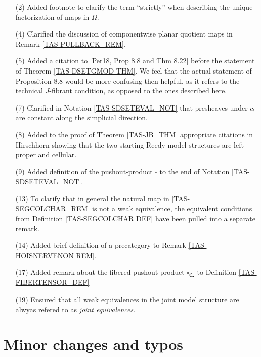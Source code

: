 \documentclass[a4paper,10pt
]{article}%
\numberwithin{equation}{section}
\numberwithin{figure}{section}
\theoremstyle{definition} %
\newcommand{\1}{\ensuremath{\mathbbm 1}}%
\begin{document}
\begin{enumerate}
\item[(2)] Added footnote to clarify the term ``strictly'' when describing the unique factorization of maps in $\Omega$.
\item[(4)] Clarified the discussion of componentwise planar quotient maps in Remark \ref{TAS-PULLBACK_REM}.
\item[(5)] Added a citation to [Per18, Prop 8.8 and Thm 8.22] before the statement of Theorem \ref{TAS-DSETGMOD THM}.
        We feel that the actual statement of Proposition 8.8 would be more confusing then helpful, as it refers to the technical $J$-fibrant condition, as opposed to the ones described here.
\item[(7)] Clarified in Notation \ref{TAS-SDSETEVAL_NOT} that presheaves under $c_!$ are constant along the simplicial direction.
\item[(8)] Added to the proof of Theorem \ref{TAS-JB_THM} appropriate citations in Hirschhorn showing that the two starting Reedy model structures are left proper and cellular.
\item[(9)] Added definition of the pushout-product $\square$ to the end of Notation \ref{TAS-SDSETEVAL_NOT}.
\item[(13)] To clarify that in general the natural map in \ref{TAS-SEGCOLCHAR_REM} is not a weak equivalence, the equivalent conditions from Definition \ref{TAS-SEGCOLCHAR DEF} have been pulled into a separate remark.
\item[(14)] Added brief definition of a precategory to Remark \ref{TAS-HOISNERVENON REM}.
\item[(17)] Added remark about the fibered pushout product $\square_{\mathfrak C_\bullet}$ to Definition \ref{TAS-FIBERTENSOR_DEF}
\item[(19)] Ensured that all weak equivalences in the joint model structure are alwyas refered to as \textit{joint equivalences}.
\end{enumerate}



\section{Minor changes and typos}
 
\end{document}
